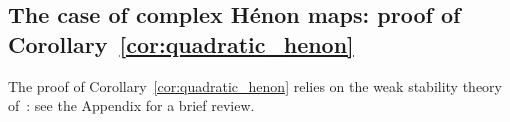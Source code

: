 \documentclass[11pt, oneside]{amsart}
\newcommand{\C}{\mathbb{C}}
\newcommand{\lo}{{\lambda_0}}
\theoremstyle{remark}
\theoremstyle{definition}
\theoremstyle{theorem}
\begin{document}
  
 \subsection{The case of complex Hénon maps: proof of Corollary~\ref{cor:quadratic_henon}}
 The proof of Corollary~\ref{cor:quadratic_henon} relies on the weak stability theory 
 of~\cite{tangencies}: see the Appendix for a brief review. 
 
\end{document}
